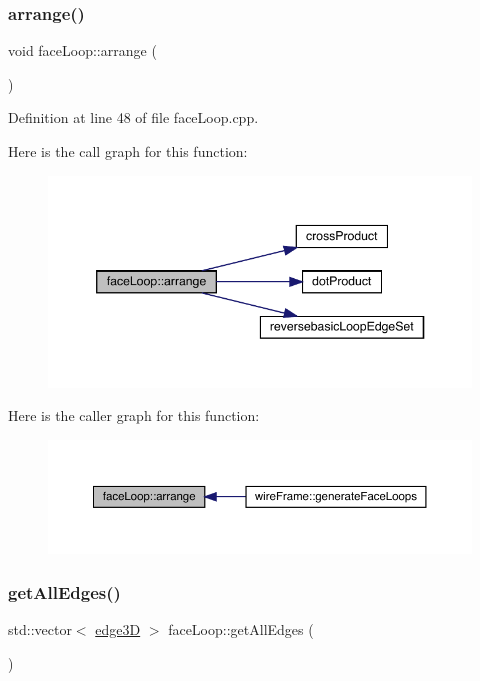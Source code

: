 \subsubsection{\texorpdfstring{arrange()}{arrange()}}
{\footnotesize\ttfamily void face\+Loop\+::arrange (\begin{DoxyParamCaption}{ }\end{DoxyParamCaption})}



Definition at line 48 of file face\+Loop.\+cpp.

Here is the call graph for this function\+:
\nopagebreak
\begin{figure}[H]
\begin{center}
\leavevmode
\includegraphics[width=346pt]{classface_loop_aa57ee2f9fd011ac4a8aa9b922998c34a_cgraph}
\end{center}
\end{figure}
Here is the caller graph for this function\+:
\nopagebreak
\begin{figure}[H]
\begin{center}
\leavevmode
\includegraphics[width=350pt]{classface_loop_aa57ee2f9fd011ac4a8aa9b922998c34a_icgraph}
\end{center}
\end{figure}
\mbox{\label{classface_loop_ad8ba004157748e073c1bc7527fda627c}} 
\subsubsection{\texorpdfstring{get\+All\+Edges()}{getAllEdges()}}
{\footnotesize\ttfamily std\+::vector$<$ \mbox{\hyperlink{structedge3_d}{edge3D}} $>$ face\+Loop\+::get\+All\+Edges (\begin{DoxyParamCaption}{ }\end{DoxyParamCaption})}



